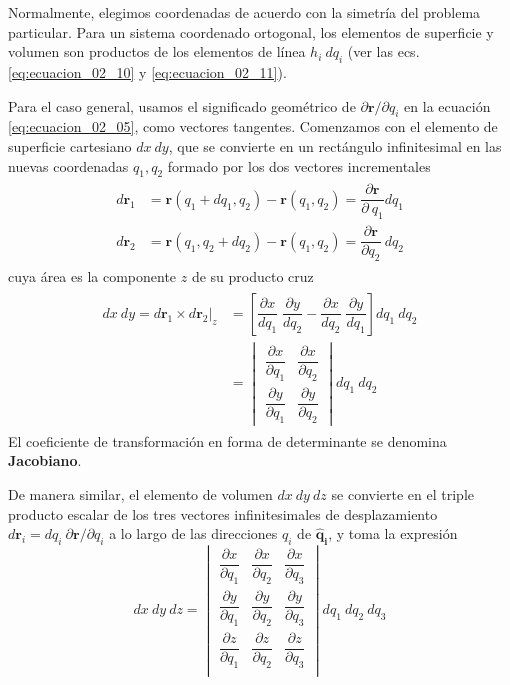Normalmente, elegimos coordenadas de acuerdo con la simetría del problema particular. Para un sistema coordenado ortogonal, los elementos de superficie y volumen son productos de los elementos de línea $h_{i} \: dq_{i}$ (ver las ecs. \ref{eq:ecuacion_02_10} y \ref{eq:ecuacion_02_11}).

Para el caso general, usamos el significado geométrico de $\partial \mathbf{r} / \partial q_{i}$ en la ecuación \ref{eq:ecuacion_02_05}, como vectores tangentes. Comenzamos con el elemento de superficie cartesiano $dx \: dy$, que se convierte en un rectángulo infinitesimal en las nuevas coordenadas $q_{1}, q_{2}$  formado por los dos vectores incrementales
\begin{align}
\begin{aligned}
d \mathbf{r}_{1} &= \mathbf{r} (q_{1} + dq_{1}, q_{2}) - \mathbf{r}(q_{1},q_{2}) = \dfrac{\partial \mathbf{r}}{\partial \: q_{1}} dq_{1} \\
d \mathbf{r}_{2} &= \mathbf{r} (q_{1}, q_{2} + dq_{2}) - \mathbf{r}(q_{1},q_{2}) = \dfrac{\partial \mathbf{r}}{\partial q_{2}} \: dq_{2}
\end{aligned}
\label{eq:ecuacion_02_14}
\end{align}
cuya área es la componente $z$ de su producto cruz
\begin{align}
\begin{aligned}
dx\: dy = d \mathbf{r}_{1} \times d \mathbf{r}_{2} \big\vert_{z} &= \left[ \dfrac{\partial x}{dq_{1}} \; \dfrac{\partial y}{dq_{2}} - \dfrac{\partial x}{dq_{2}} \; \dfrac{\partial y}{dq_{1}} \right] dq_{1} \: dq_{2} \\
&= \begin{vmatrix}
\dfrac{\partial x}{\partial q_{1}} & \dfrac{\partial x}{\partial q_{2}} \\[1em]
\dfrac{\partial y}{\partial q_{1}} & \dfrac{\partial y}{\partial q_{2}} 
\end{vmatrix} dq_{1} \: d q_{2}
\end{aligned}
\label{eq:ecuacion_02_15}
\end{align}
El coeficiente de transformación en forma de determinante se denomina \textbf{Jacobiano}.
\par
De manera similar, el elemento de volumen $dx \: dy \: dz$ se convierte en el triple producto escalar de los tres vectores infinitesimales de desplazamiento $d \mathbf{r}_{i}  = d q_{i} \: \partial \mathbf{r} / \partial q_{i} $ a lo largo de las direcciones $q_{i}$ de $\mathbf{\widehat{q}_{i}}$, y toma la expresión
\begin{equation}
dx \: dy \: dz = \begin{vmatrix}
\dfrac{\partial x}{\partial q_{1}} & \dfrac{\partial x}{\partial q_{2}} & \dfrac{\partial x}{\partial q_{3}} \\[1em]
\dfrac{\partial y}{\partial q_{1}} & \dfrac{\partial y}{\partial q_{2}} & \dfrac{\partial y}{\partial q_{3}} \\[1em]
\dfrac{\partial z}{\partial q_{1}} & \dfrac{\partial z}{\partial q_{2}} & \dfrac{\partial z}{\partial q_{3}} \\
\end{vmatrix}
d q_{1} \: d q_{2} \: d q_{3} 
\label{eq:ecuacion_02_16}
\end{equation}
